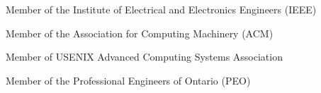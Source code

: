 \begin{innerenum}
    \item Member of the Institute of Electrical and Electronics Engineers (IEEE)
    \item Member of the Association for Computing Machinery (ACM)
    \item Member of USENIX Advanced Computing Systems Association
    \item Member of the Professional Engineers of Ontario (PEO)
\end{innerenum}
    